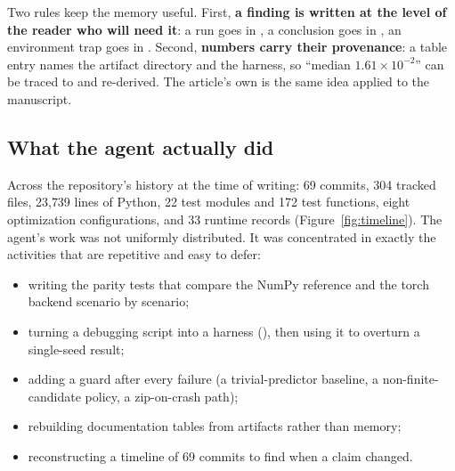 Two rules keep the memory useful. First, \textbf{a finding is written at the
level of the reader who will need it}: a run goes in , a
conclusion goes in , an environment trap goes in
. Second, \textbf{numbers carry their provenance}: a table entry
names the artifact directory and the harness, so ``median $1.61\times10^{-2}$''
can be traced to  and re-derived. The article's
own  is the same idea applied to the manuscript.

\subsection{What the agent actually did}
\label{sec:agent-work}

Across the repository's history at the time of writing: 69 commits, 304 tracked
files, 23{,}739 lines of Python, 22 test modules and 172 test functions, eight
optimization configurations, and 33 runtime records (Figure~\ref{fig:timeline}).
The agent's work was not uniformly distributed. It was concentrated in exactly
the activities that are repetitive and easy to defer:
\begin{itemize}
  \item writing the parity tests that compare the NumPy reference and the torch
        backend scenario by scenario;
  \item turning a debugging script into a harness (), then
        using it to overturn a single-seed result;
  \item adding a guard after every failure (a trivial-predictor baseline, a
        non-finite-candidate policy, a zip-on-crash path);
  \item rebuilding documentation tables from artifacts rather than memory;
  \item reconstructing a timeline of 69 commits to find when a claim changed.
\end{itemize}

